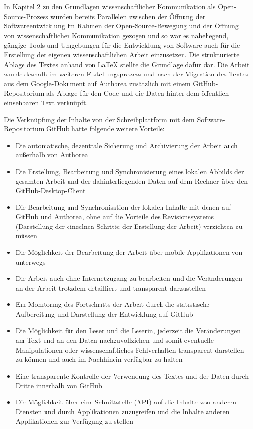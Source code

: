 In Kapitel 2 zu den Grundlagen wissenschaftlicher Kommunikation als Open-Source-Prozess wurden bereits Parallelen zwischen der Öffnung der Softwareentwicklung im Rahmen der Open-Source-Bewegung und der Öffnung von wissenschaftlicher Kommunikation gezogen und so war es naheliegend, gängige Tools und Umgebungen für die Entwicklung von Software auch für die Erstellung der eigenen wissenschaftlichen Arbeit einzusetzen. Die strukturierte Ablage des Textes anhand von LaTeX stellte die Grundlage dafür dar. Die Arbeit wurde deshalb im weiteren Erstellungsprozess und nach der Migration des Textes aus dem Google-Dokument auf Authorea zusätzlich mit einem GitHub-Repositorium als Ablage für den Code und die Daten hinter dem öffentlich einsehbaren Text verknüpft.

Die Verknüpfung der Inhalte von der Schreibplattform mit dem Software-Repositorium GitHub hatte folgende weitere Vorteile:
\begin{itemize}
\item Die automatische, dezentrale Sicherung und Archivierung der Arbeit auch außerhalb von Authorea
\item Die Erstellung, Bearbeitung und Synchronisierung eines lokalen Abbilds der gesamten Arbeit und der dahinterliegenden Daten auf dem Rechner über den GitHub-Desktop-Client
\item Die Bearbeitung und Synchronisation der lokalen Inhalte mit denen auf GitHub und Authorea, ohne auf die Vorteile des Revisionssystems (Darstellung der einzelnen Schritte der Erstellung der Arbeit) verzichten zu müssen
\item Die Möglichkeit der Bearbeitung der Arbeit über mobile Applikationen von unterwegs
\item Die Arbeit auch ohne Internetzugang zu bearbeiten und die Veränderungen an der Arbeit trotzdem detailliert und transparent darzustellen
\item Ein Monitoring des Fortschritts der Arbeit durch die statistische Aufbereitung und Darstellung der Entwicklung auf GitHub
\item Die Möglichkeit für den Leser und die Leserin, jederzeit die Veränderungen am Text und an den Daten nachzuvollziehen und somit eventuelle Manipulationen oder wissenschaftliches Fehlverhalten transparent darstellen zu können und auch im Nachhinein verfügbar zu halten
\item Eine transparente Kontrolle der Verwendung des Textes und der Daten durch Dritte innerhalb von GitHub
\item Die Möglichkeit über eine Schnittstelle (API) auf die Inhalte von anderen Diensten und durch Applikationen zuzugreifen und die Inhalte anderen Applikationen zur Verfügung zu stellen
\end{itemize}

